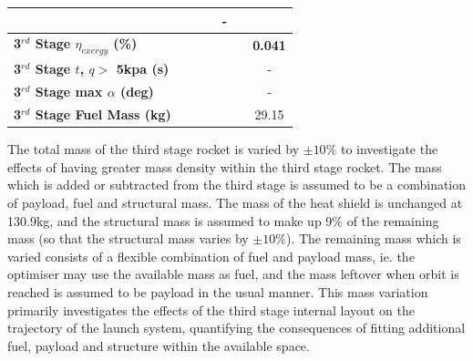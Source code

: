 \begin{table}[ht]
\begin{tabular}{l c c c c c c}
		& \secondFlightTimemThreeStandardNoReturn
		& \secondFlightTimemThreeOneHundredFiveNoReturn
		& \secondFlightTimemThreeOneHundredTenNoReturn
		& -
		\\
		\hline 
		\textbf{3$^{rd}$ Stage $\eta_{exergy}$ (\%)}
		& \textbf{\thirddExergyEffmThreeNinetyNoReturn}
		& \textbf{\thirddExergyEffmThreeNinetyFiveNoReturn}
		& \textbf{\thirddExergyEffmThreeStandardNoReturn}
		& \textbf{\thirddExergyEffmThreeOneHundredFiveNoReturn}
		& \textbf{\thirddExergyEffmThreeOneHundredTenNoReturn}
		& \textbf{0.041}
		\\
		\textbf{3$^{rd}$ Stage $t$, $q >$ 5kpa (s)}
		& \thirdqOverFivemThreeNinetyNoReturn
		& \thirdqOverFivemThreeNinetyFiveNoReturn
		& \thirdqOverFivemThreeStandardNoReturn
		& \thirdqOverFivemThreeOneHundredFiveNoReturn
		& \thirdqOverFivemThreeOneHundredTenNoReturn
		& -
		\\
		\textbf{3$^{rd}$ Stage max $\alpha$ (deg)}
		& \thirdmaxAoAmThreeNinetyNoReturn
		& \thirdmaxAoAmThreeNinetyFiveNoReturn
		& \thirdmaxAoAmThreeStandardNoReturn
		& \thirdmaxAoAmThreeOneHundredFiveNoReturn
		& \thirdmaxAoAmThreeOneHundredTenNoReturn
		& -
		\\
		\textbf{3$^{rd}$ Stage Fuel Mass (kg)}
		& \thirdmFuelmThreeNinetyNoReturn
		& \thirdmFuelmThreeNinetyFiveNoReturn
		& \thirdmFuelmThreeStandardNoReturn
		& \thirdmFuelmThreeOneHundredFiveNoReturn
		& \thirdmFuelmThreeOneHundredTenNoReturn
		&29.15
		\\
		\hline 
	\end{tabular} 
	
\end{table}


The total mass of the third stage rocket is varied by $\pm10\%$ to investigate the effects of having greater mass density within the third stage rocket. The mass which is added or subtracted from the third stage is assumed to be a combination of payload, fuel and structural mass. 
The mass of the heat shield is unchanged at 130.9kg, and the structural mass is assumed to make up 9\% of the remaining mass (so that the structural mass varies by $\pm10\%$). The remaining mass which is varied consists of a flexible combination of fuel and payload mass, ie. the optimiser may use the available mass as fuel, and the mass leftover when orbit is reached is assumed to be payload in the usual manner. 
This mass variation primarily investigates the effects of the third stage internal layout on the trajectory of the launch system, quantifying the consequences of fitting additional fuel, payload and structure within the available space.

